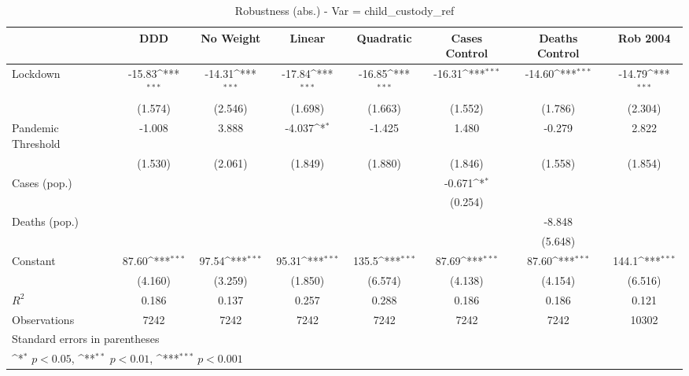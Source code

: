 \documentclass{article}
\begin{document}
{
\def\sym#1{\ifmmode^{#1}\else\(^{#1}\)\fi}
\begin{longtable}{l*{7}{c}}
\caption{Robustness (abs.) - Var = child\_custody\_ref}\\
\hline\hline\endfirsthead\hline\endhead\hline\endfoot\endlastfoot
                &\multicolumn{1}{c}{DDD}&\multicolumn{1}{c}{No Weight}&\multicolumn{1}{c}{Linear}&\multicolumn{1}{c}{Quadratic}&\multicolumn{1}{c}{Cases Control}&\multicolumn{1}{c}{Deaths Control}&\multicolumn{1}{c}{Rob 2004}\\
\hline
Lockdown        &   -15.83\sym{***}&   -14.31\sym{***}&   -17.84\sym{***}&   -16.85\sym{***}&   -16.31\sym{***}&   -14.60\sym{***}&   -14.79\sym{***}\\
                &  (1.574)         &  (2.546)         &  (1.698)         &  (1.663)         &  (1.552)         &  (1.786)         &  (2.304)         \\
Pandemic Threshold&   -1.008         &    3.888         &   -4.037\sym{*}  &   -1.425         &    1.480         &   -0.279         &    2.822         \\
                &  (1.530)         &  (2.061)         &  (1.849)         &  (1.880)         &  (1.846)         &  (1.558)         &  (1.854)         \\
Cases (pop.)    &                  &                  &                  &                  &   -0.671\sym{*}  &                  &                  \\
                &                  &                  &                  &                  &  (0.254)         &                  &                  \\
Deaths (pop.)   &                  &                  &                  &                  &                  &   -8.848         &                  \\
                &                  &                  &                  &                  &                  &  (5.648)         &                  \\
Constant        &    87.60\sym{***}&    97.54\sym{***}&    95.31\sym{***}&    135.5\sym{***}&    87.69\sym{***}&    87.60\sym{***}&    144.1\sym{***}\\
                &  (4.160)         &  (3.259)         &  (1.850)         &  (6.574)         &  (4.138)         &  (4.154)         &  (6.516)         \\
\hline
\(R^{2}\)       &    0.186         &    0.137         &    0.257         &    0.288         &    0.186         &    0.186         &    0.121         \\
Observations    &     7242         &     7242         &     7242         &     7242         &     7242         &     7242         &    10302         \\
\hline\hline
\multicolumn{8}{l}{\footnotesize Standard errors in parentheses}\\
\multicolumn{8}{l}{\footnotesize \sym{*} \(p<0.05\), \sym{**} \(p<0.01\), \sym{***} \(p<0.001\)}\\
\end{longtable}
}
\end{document}
